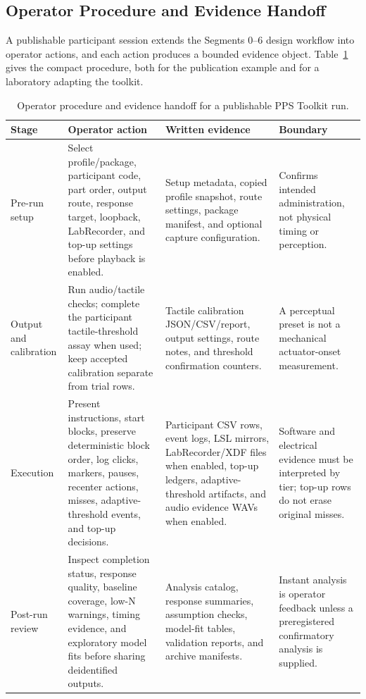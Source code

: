 \documentclass[pdflatex,sn-apa]{sn-jnl}
\begin{document}
\subsection{Operator Procedure and Evidence Handoff}

A publishable participant session extends the Segments 0--6 design workflow into operator actions, and each action produces a bounded evidence object. Table~\ref{tab:operator-procedure} gives the compact procedure, both for the publication example and for a laboratory adapting the toolkit.

\begin{table}[t]
\caption{Operator procedure and evidence handoff for a publishable PPS Toolkit run.}
\label{tab:operator-procedure}
\footnotesize
\begin{tabularx}{\textwidth}{>{\raggedright\arraybackslash}p{} >{\raggedright\arraybackslash}X >{\raggedright\arraybackslash}p{} >{\raggedright\arraybackslash}p{}}
\toprule
Stage & Operator action & Written evidence & Boundary \\
\midrule
Pre-run setup & Select profile/package, participant code, part order, output route, response target, loopback, LabRecorder, and top-up settings before playback is enabled. & Setup metadata, copied profile snapshot, route settings, package manifest, and optional capture configuration. & Confirms intended administration, not physical timing or perception. \\
Output and calibration & Run audio/tactile checks; complete the participant tactile-threshold assay when used; keep accepted calibration separate from trial rows. & Tactile calibration JSON/CSV/report, output settings, route notes, and threshold confirmation counters. & A perceptual preset is not a mechanical actuator-onset measurement. \\
Execution & Present instructions, start blocks, preserve deterministic block order, log clicks, markers, pauses, recenter actions, misses, adaptive-threshold events, and top-up decisions. & Participant CSV rows, event logs, LSL mirrors, LabRecorder/XDF files when enabled, top-up ledgers, adaptive-threshold artifacts, and audio evidence WAVs when enabled. & Software and electrical evidence must be interpreted by tier; top-up rows do not erase original misses. \\
Post-run review & Inspect completion status, response quality, baseline coverage, low-N warnings, timing evidence, and exploratory model fits before sharing deidentified outputs. & Analysis catalog, response summaries, assumption checks, model-fit tables, validation reports, and archive manifests. & Instant analysis is operator feedback unless a preregistered confirmatory analysis is supplied. \\

\end{tabularx}
\end{table}
\end{document}
